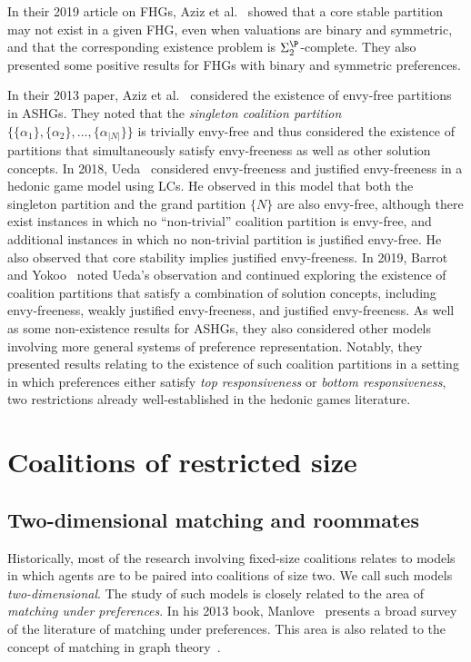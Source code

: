In their 2019 article on FHGs, Aziz et al.~\cite{ABBHOP19} showed that a core stable partition may not exist in a given FHG, even when valuations are binary and symmetric, and that the corresponding existence problem is $\Sigma_2^\P$-complete. They also presented some positive results for FHGs with binary and symmetric preferences.

In their 2013 paper, Aziz et al.~\cite{AZIZ2013316} considered the existence of envy-free partitions in ASHGs. They noted that the \emph{singleton coalition partition} $\{ \{ \alpha_1 \}, \{ \alpha_2 \}, \dots, \{ \alpha_{|N|} \} \}$ is trivially envy-free and thus considered the existence of partitions that simultaneously satisfy envy-freeness as well as other solution concepts. 
In 2018, Ueda~\cite{Ued18} considered envy-freeness and justified envy-freeness in a hedonic game model using LCs. He observed in this model that both the singleton partition and the grand partition $\{ N \}$ are also envy-free, although there exist instances in which no ``non-trivial'' coalition partition is envy-free, and additional instances in which no non-trivial partition is justified envy-free. He also observed that core stability implies justified envy-freeness.
In 2019, Barrot and Yokoo~\cite{BY19} noted Ueda's observation and continued exploring the existence of coalition partitions that satisfy a combination of solution concepts, including envy-freeness, weakly justified envy-freeness, and justified envy-freeness. As well as some non-existence results for ASHGs, they also considered other models involving more general systems of preference representation. Notably, they presented results relating to the existence of such coalition partitions in a setting in which preferences either satisfy \emph{top responsiveness} or \emph{bottom responsiveness}, two restrictions already well-established in the hedonic games literature.

\section{Coalitions of restricted size}
\label{sec:lit_review_matchingunderpreferences}

\subsection{Two-dimensional matching and roommates}

Historically, most of the research involving fixed-size coalitions relates to models in which agents are to be paired into coalitions of size two. We call such models \emph{two-dimensional}. The study of such models is closely related to the area of \emph{matching under preferences}. In his 2013 book, Manlove~\cite{AMUP} presents a broad survey of the literature of matching under preferences. This area is also related to the concept of matching in graph theory~\cite{combinatorialwest}.

